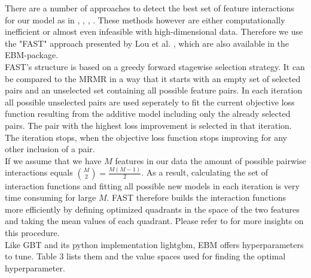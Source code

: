 \documentclass[12pt,titlepage]{article}
\begin{document}
There are a number of approaches to detect the best set of feature interactions for our model as in \cite{anova_interaction}, \cite{pdf_interaction}, \cite{guide}, \cite{grove}. These methods however are either computationally inefficient or almost even infeasible with high-dimensional data. Therefore we use the "FAST" approach presented by Lou et al. \cite{ga2m}, which are also available in the EBM-package. \\
FAST's structure is based on a greedy forward stagewise selection strategy. It can be compared to the MRMR in a way that it starts with an empty set of selected pairs and an unselected set containing all possible feature pairs. In each iteration all possible unselected pairs are used seperately to fit the current objective loss function resulting from the additive model including only the already selected pairs. The pair with the highest loss improvement is selected in that iteration. The iteration stops, when the objective loss function stops improving for any other inclusion of a pair. \\
If we assume that we have $M$ features in our data the amount of possible pairwise interactions equals $\binom{M}{2} = \frac{M(M-1)}{2}$. As a result, calculating the set of interaction functions and fitting all possible new models in each iteration is very time consuming for large $M$. FAST therefore builds the interaction functions more efficiently by defining optimized quadrants in the space of the two features and taking the mean values of each quadrant. Please refer to \cite{ga2m} for more insights on this procedure. \\
Like GBT and its python implementation lightgbm, EBM offers hyperparameters to tune. Table 3 lists them and the value spaces used for finding the optimal hyperparameter. \\
\end{document}
